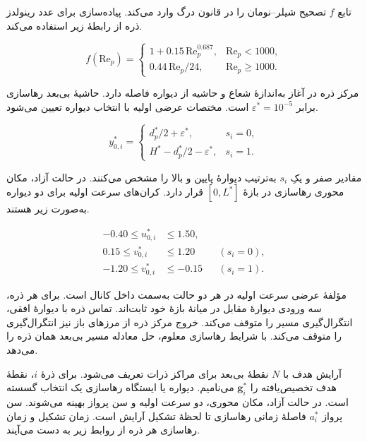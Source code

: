 تابع $f$ تصحیح شیلر–نومان را در قانون درگ وارد می‌کند.
پیاده‌سازی برای عدد رینولدز ذره از رابطهٔ زیر استفاده می‌کند.

\begin{equation}
f(\mathrm{Re}_p)=
\begin{cases}
1+0.15\,\mathrm{Re}_p^{0.687}, & \mathrm{Re}_p<1000,\\
0.44\,\mathrm{Re}_p/24, & \mathrm{Re}_p\ge 1000.
\end{cases}
\label{eq:formation-drag-factor}
\end{equation}

مرکز ذره در آغاز به‌اندازهٔ شعاع و حاشیه از دیواره فاصله دارد.
حاشیهٔ بی‌بعد رهاسازی برابر $\varepsilon^*=10^{-5}$ است.
مختصات عرضی اولیه با انتخاب دیواره تعیین می‌شود.

\begin{equation}
y_{0,i}^*=
\begin{cases}
d_p^*/2+\varepsilon^*, & s_i=0,\\
H^*-d_p^*/2-\varepsilon^*, & s_i=1.
\end{cases}
\label{eq:formation-release-height}
\end{equation}

مقادیر صفر و یکِ $s_i$ به‌ترتیب دیوارهٔ پایین و بالا را مشخص می‌کنند.
در حالت آزاد، مکان محوری رهاسازی در بازهٔ $[0,L^*]$ قرار دارد.
کران‌های سرعت اولیه برای دو دیواره به‌صورت زیر هستند.

\begin{equation}
\begin{aligned}
-0.40 \le u_{0,i}^* &\le 1.50,\\
0.15 \le v_{0,i}^* &\le 1.20 && (s_i=0),\\
-1.20 \le v_{0,i}^* &\le -0.15 && (s_i=1).
\end{aligned}
\label{eq:formation-release-velocity-bounds}
\end{equation}

مؤلفهٔ عرضی سرعت اولیه در هر دو حالت به‌سمت داخل کانال است.
برای هر ذره، سه ورودی دیوارهٔ مقابل در میانهٔ بازهٔ خود ثابت‌اند.
تماس ذره با دیوارهٔ افقی، انتگرال‌گیری مسیر را متوقف می‌کند.
خروج مرکز ذره از مرزهای باز نیز انتگرال‌گیری را متوقف می‌کند.
با شرایط رهاسازی معلوم، حل معادله مسیر بی‌بعد همان ذره را می‌دهد.

\label{sec:formation-objective}

آرایش هدف با $N$ نقطهٔ بی‌بعد برای مراکز ذرات تعریف می‌شود.
برای ذرهٔ $i$، نقطهٔ هدف تخصیص‌یافته را $\mathbf g_i^*$ می‌نامیم.
دیواره یا ایستگاه رهاسازی یک انتخاب گسسته است.
در حالت آزاد، مکان محوری، دو سرعت اولیه و سن پرواز بهینه می‌شوند.
سن پرواز $a_i^*$ فاصلهٔ زمانی رهاسازی تا لحظهٔ تشکیل آرایش است.
زمان تشکیل و زمان رهاسازی هر ذره از روابط زیر به دست می‌آیند.

